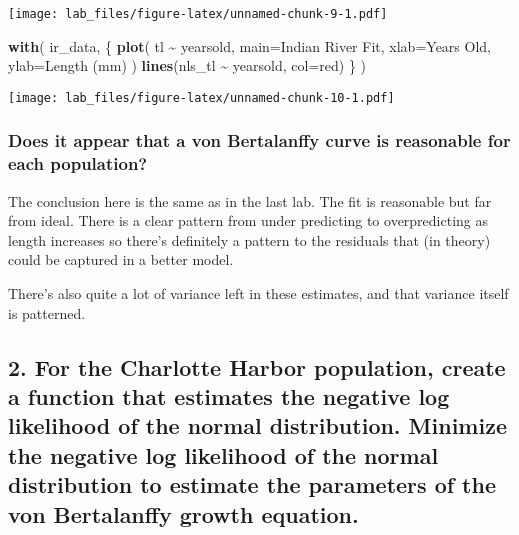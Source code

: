 \documentclass[
]{article}
\newenvironment{Shaded}{\begin{snugshade}}{\end{snugshade}}
\newcommand{\DataTypeTok}[1]{\textcolor[rgb]{0.13,0.29,0.53}{#1}}
\newcommand{\KeywordTok}[1]{\textcolor[rgb]{0.13,0.29,0.53}{\textbf{#1}}}
\newcommand{\NormalTok}[1]{#1}
\newcommand{\OperatorTok}[1]{\textcolor[rgb]{0.81,0.36,0.00}{\textbf{#1}}}
\newcommand{\StringTok}[1]{\textcolor[rgb]{0.31,0.60,0.02}{#1}}
\begin{document}
\texttt{[image: lab\_files/figure-latex/unnamed-chunk-9-1.pdf]}

\begin{Shaded}
\begin{Highlighting}[]
\KeywordTok{with}\NormalTok{(}
\NormalTok{  ir\_data, \{}
    \KeywordTok{plot}\NormalTok{(}
\NormalTok{      tl }\OperatorTok{\textasciitilde{}}\StringTok{ }\NormalTok{yearsold,}
      \DataTypeTok{main=}\StringTok{\textquotesingle{}Indian River Fit\textquotesingle{}}\NormalTok{,}
      \DataTypeTok{xlab=}\StringTok{\textquotesingle{}Years Old\textquotesingle{}}\NormalTok{,}
      \DataTypeTok{ylab=}\StringTok{\textquotesingle{}Length (mm)\textquotesingle{}}
\NormalTok{    )}
    \KeywordTok{lines}\NormalTok{(nls\_tl }\OperatorTok{\textasciitilde{}}\StringTok{ }\NormalTok{yearsold, }\DataTypeTok{col=}\StringTok{\textquotesingle{}red\textquotesingle{}}\NormalTok{)}
\NormalTok{  \}}
\NormalTok{)}
\end{Highlighting}
\end{Shaded}

\texttt{[image: lab\_files/figure-latex/unnamed-chunk-10-1.pdf]}

\hypertarget{does-it-appear-that-a-von-bertalanffy-curve-is-reasonable-for-each-population}{%
\subsubsection{Does it appear that a von Bertalanffy curve is reasonable
for each
population?}\label{does-it-appear-that-a-von-bertalanffy-curve-is-reasonable-for-each-population}}

The conclusion here is the same as in the last lab. The fit is
reasonable but far from ideal. There is a clear pattern from under
predicting to overpredicting as length increases so there's definitely a
pattern to the residuals that (in theory) could be captured in a better
model.

There's also quite a lot of variance left in these estimates, and that
variance itself is patterned.

\hypertarget{for-the-charlotte-harbor-population-create-a-function-that-estimates-the-negative-log-likelihood-of-the-normal-distribution.-minimize-the-negative-log-likelihood-of-the-normal-distribution-to-estimate-the-parameters-of-the-von-bertalanffy-growth-equation.}{%
\subsection{2. For the Charlotte Harbor population, create a function
that estimates the negative log likelihood of the normal distribution.
Minimize the negative log likelihood of the normal distribution to
estimate the parameters of the von Bertalanffy growth
equation.}\label{for-the-charlotte-harbor-population-create-a-function-that-estimates-the-negative-log-likelihood-of-the-normal-distribution.-minimize-the-negative-log-likelihood-of-the-normal-distribution-to-estimate-the-parameters-of-the-von-bertalanffy-growth-equation.}}
\end{document}
